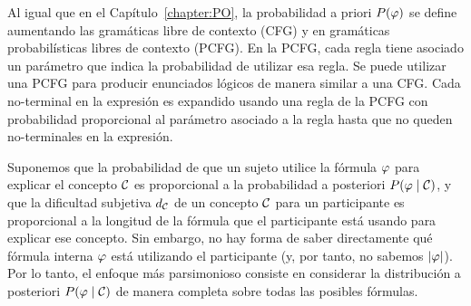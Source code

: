 Al igual que en el Capítulo~\ref{chapter:PO}, la probabilidad a priori $P(\varphi)$ se define aumentando las gramáticas libre de contexto (CFG) \grambool y \gramboolxor en gramáticas probabilísticas libres de contexto (PCFG). En la PCFG, cada regla tiene asociado un parámetro que indica la probabilidad de utilizar esa regla. Se puede utilizar una PCFG para producir enunciados lógicos de manera similar a una CFG. Cada no-terminal en la expresión es expandido usando una regla de la PCFG con probabilidad proporcional al parámetro asociado a la regla hasta que no queden no-terminales en la expresión.



Suponemos que la probabilidad de que un sujeto utilice la fórmula $\varphi$ para explicar el concepto $\mathcal{C}$ es proporcional a la probabilidad a posteriori $P(\varphi \mid \mathcal{C})$, y que la dificultad subjetiva $d_{\mathcal{C}}$ de un concepto $\mathcal{C}$ para un participante es proporcional a la longitud de la fórmula que el participante está usando para explicar ese concepto. Sin embargo, no hay forma de saber directamente qué fórmula interna $\varphi$ está utilizando el participante (y, por tanto, no sabemos $|\varphi|$). Por lo tanto, el enfoque más parsimonioso consiste en considerar la distribución a posteriori $P(\varphi \mid \mathcal{C})$ de manera completa sobre todas las posibles fórmulas.

